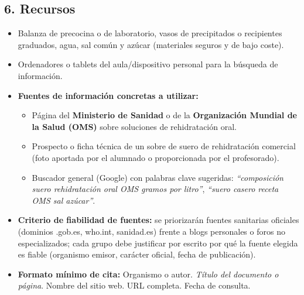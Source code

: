\documentclass[11pt,a4paper]{article}
\begin{document}
\subsection*{6. Recursos}
\begin{itemize}
    \item Balanza de precocina o de laboratorio, vasos de precipitados o recipientes graduados, agua, sal común y azúcar (materiales seguros y de bajo coste).
    \item Ordenadores o tablets del aula/dispositivo personal para la búsqueda de información.
    \item \textbf{Fuentes de información concretas a utilizar:}
    \begin{itemize}
        \item Página del \textbf{Ministerio de Sanidad} o de la \textbf{Organización Mundial de la Salud (OMS)} sobre soluciones de rehidratación oral.
        \item Prospecto o ficha técnica de un sobre de suero de rehidratación comercial (foto aportada por el alumnado o proporcionada por el profesorado).
        \item Buscador general (Google) con palabras clave sugeridas: \textit{``composición suero rehidratación oral OMS gramos por litro''}, \textit{``suero casero receta OMS sal azúcar''}.
    \end{itemize}
    \item \textbf{Criterio de fiabilidad de fuentes:} se priorizarán fuentes sanitarias oficiales (dominios .gob.es, who.int, sanidad.es) frente a blogs personales o foros no especializados; cada grupo debe justificar por escrito por qué la fuente elegida es fiable (organismo emisor, carácter oficial, fecha de publicación).
    \item \textbf{Formato mínimo de cita:} Organismo o autor. \textit{Título del documento o página}. Nombre del sitio web. URL completa. Fecha de consulta.
\end{itemize}
\end{document}
